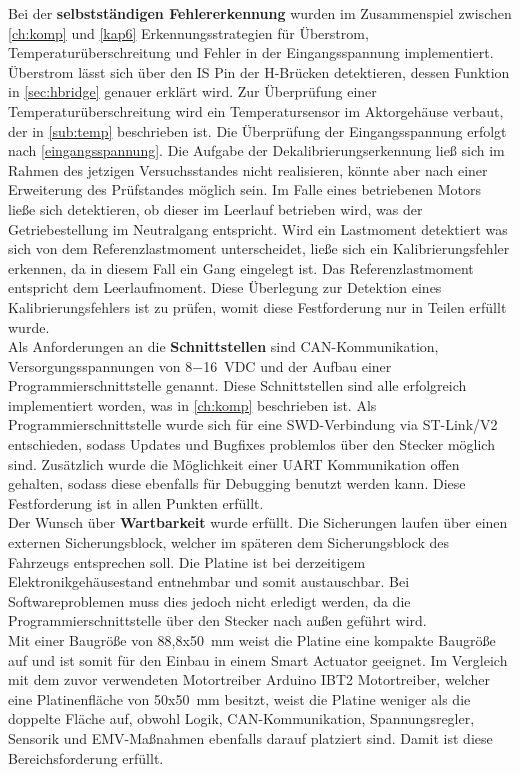 Bei der \textbf{selbstständigen Fehlererkennung} wurden im Zusammenspiel zwischen \autoref{ch:komp} und \autoref{kap6} Erkennungsstrategien für Überstrom, Temperaturüberschreitung und Fehler in der Eingangsspannung implementiert. Überstrom lässt sich über den IS Pin der H-Brücken detektieren, dessen Funktion in \autoref{sec:hbridge} genauer erklärt wird. Zur Überprüfung einer Temperaturüberschreitung wird ein Temperatursensor im Aktorgehäuse verbaut, der in \autoref{sub:temp} beschrieben ist. Die Überprüfung der Eingangsspannung erfolgt nach \autoref{eingangsspannung}. Die Aufgabe der Dekalibrierungserkennung ließ sich im Rahmen des jetzigen Versuchsstandes nicht realisieren, könnte aber nach einer Erweiterung des Prüfstandes möglich sein. Im Falle eines betriebenen Motors ließe sich detektieren, ob dieser im Leerlauf betrieben wird, was der Getriebestellung im Neutralgang entspricht. Wird ein Lastmoment detektiert was sich von dem Referenzlastmoment unterscheidet, ließe sich ein Kalibrierungsfehler erkennen, da in diesem Fall ein Gang eingelegt ist. Das Referenzlastmoment entspricht dem Leerlaufmoment. Diese Überlegung zur Detektion eines Kalibrierungsfehlers ist zu prüfen, womit diese Festforderung nur in Teilen erfüllt wurde.\\
Als Anforderungen an die \textbf{Schnittstellen} sind CAN-Kommunikation, Versorgungsspannungen von \SI{8-16}{VDC} und der Aufbau einer Programmierschnittstelle genannt. Diese Schnittstellen sind alle erfolgreich implementiert worden, was in \autoref{ch:komp} beschrieben ist. Als Programmierschnittstelle wurde sich für eine SWD-Verbindung via ST-Link/V2 entschieden, sodass Updates und Bugfixes problemlos über den Stecker möglich sind. Zusätzlich wurde die Möglichkeit einer UART Kommunikation offen gehalten, sodass diese ebenfalls für Debugging benutzt werden kann. Diese Festforderung ist in allen Punkten erfüllt.\\
Der Wunsch über \textbf{Wartbarkeit} wurde erfüllt. Die Sicherungen laufen über einen externen Sicherungsblock, welcher im späteren dem Sicherungsblock des Fahrzeugs entsprechen soll. Die Platine ist bei derzeitigem Elektronikgehäusestand entnehmbar und somit austauschbar. Bei Softwareproblemen muss dies jedoch nicht erledigt werden, da die Programmierschnittstelle über den Stecker nach außen geführt wird. \\
Mit einer Baugröße von 88,8x\SI{50}{mm} weist die Platine eine kompakte Baugröße auf und ist somit für den Einbau in einem Smart Actuator geeignet. Im Vergleich mit dem zuvor verwendeten Motortreiber Arduino IBT2 Motortreiber, welcher eine Platinenfläche von 50x\SI{50}{mm} besitzt, weist die Platine weniger als die doppelte Fläche auf, obwohl Logik, CAN-Kommunikation, Spannungsregler, Sensorik und EMV-Maßnahmen ebenfalls darauf platziert sind. Damit ist diese Bereichsforderung erfüllt. \\
